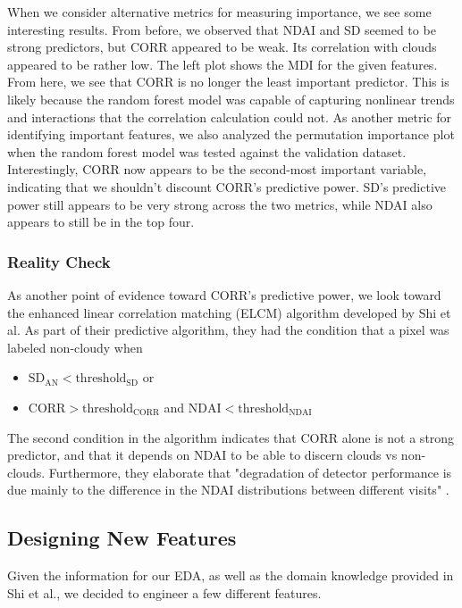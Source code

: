 \documentclass[11pt,letterpaper]{article}
\begin{document}
When we consider alternative metrics for measuring importance, we see some interesting results. From before, we observed that NDAI and SD seemed to be strong predictors, but CORR appeared to be weak. Its correlation with clouds appeared to be rather low. The left plot shows the MDI for the given features. From here, we see that CORR is no longer the least important predictor. This is likely because the random forest model was capable of capturing nonlinear trends and interactions that the correlation calculation could not. As another metric for identifying important features, we also analyzed the permutation importance plot when the random forest model was tested against the validation dataset. Interestingly, CORR now appears to be the second-most important variable, indicating that we shouldn't discount CORR's predictive power. SD's predictive power still appears to be very strong across the two metrics, while NDAI also appears to still be in the top four.

\subsubsection{Reality Check}

As another point of evidence toward CORR's predictive power, we look toward the enhanced linear correlation matching (ELCM) algorithm developed by Shi et al. As part of their predictive algorithm, they had the condition that a pixel was labeled non-cloudy when

\begin{itemize}
    \item $\text{SD}_{\text{AN}} < \text{threshold}_{\text{SD}}$ or
    \item $\text{CORR} > \text{threshold}_{\text{CORR}}$ and $\text{NDAI} < \text{threshold}_{\text{NDAI}}$ \cite{Shi}
\end{itemize}

The second condition in the algorithm indicates that CORR alone is not a strong predictor, and that it depends on NDAI to be able to discern clouds vs non-clouds. Furthermore, they elaborate that "degradation of detector performance is due mainly to the difference in the NDAI distributions between different visits" \cite{Shi}.

\subsection{Designing New Features}

Given the information for our EDA, as well as the domain knowledge provided in Shi et al., we decided to engineer a few different features.
\end{document}
